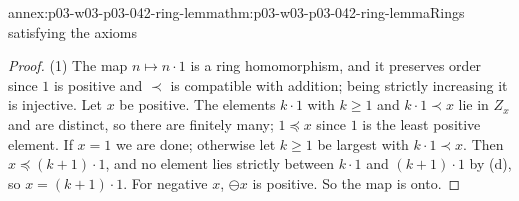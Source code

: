 \begin{annexitem}{annex:p03-w03-p03-042-ring-lemma}{thm:p03-w03-p03-042-ring-lemma}{Rings satisfying the axioms}
\begin{proof}
(1) The map \(n\mapsto n\cdot1\) is a ring homomorphism, and it preserves
order since \(1\) is positive and \(\prec\) is compatible with addition;
being strictly increasing it is injective.  Let \(x\) be positive.  The
elements \(k\cdot1\) with \(k\geq1\) and \(k\cdot1\prec x\) lie in
\(Z_x\) and are distinct, so there are
finitely many; \(1\preceq x\) since \(1\) is the least positive element.
If \(x=1\) we are done; otherwise let \(k\geq1\) be largest with
\(k\cdot1\prec x\).  Then \(x\preceq(k+1)\cdot1\), and no element lies
strictly between \(k\cdot1\) and \((k+1)\cdot1\) by (d), so
\(x=(k+1)\cdot1\).  For negative \(x\), \(\ominus x\) is positive.  So the
map is onto.


\end{proof}
\end{annexitem}
